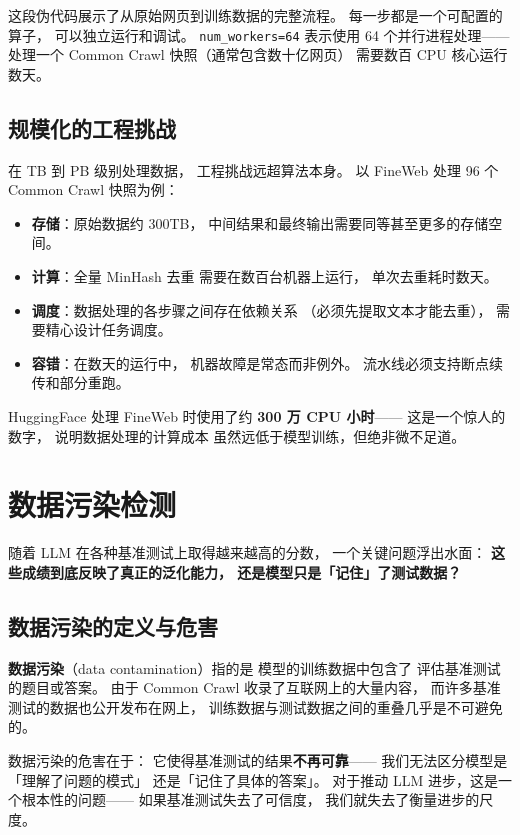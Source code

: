 这段伪代码展示了从原始网页到训练数据的完整流程。
每一步都是一个可配置的算子，
可以独立运行和调试。
\texttt{num\_workers=64} 表示使用 64 个并行进程处理——
处理一个 Common Crawl 快照（通常包含数十亿网页）
需要数百 CPU 核心运行数天。

\subsection{规模化的工程挑战}

在 TB 到 PB 级别处理数据，
工程挑战远超算法本身。
以 FineWeb 处理 96 个 Common Crawl 快照为例：

\begin{itemize}[noitemsep]
  \item \textbf{存储}：原始数据约 300TB，
        中间结果和最终输出需要同等甚至更多的存储空间。
  \item \textbf{计算}：全量 MinHash 去重
        需要在数百台机器上运行，
        单次去重耗时数天。
  \item \textbf{调度}：数据处理的各步骤之间存在依赖关系
        （必须先提取文本才能去重），
        需要精心设计任务调度。
  \item \textbf{容错}：在数天的运行中，
        机器故障是常态而非例外。
        流水线必须支持断点续传和部分重跑。
\end{itemize}

HuggingFace 处理 FineWeb 时使用了约 \textbf{300 万 CPU 小时}——
这是一个惊人的数字，
说明数据处理的计算成本
虽然远低于模型训练，但绝非微不足道。

\section{数据污染检测}

随着 LLM 在各种基准测试上取得越来越高的分数，
一个关键问题浮出水面：
\textbf{这些成绩到底反映了真正的泛化能力，
还是模型只是「记住」了测试数据？}

\subsection{数据污染的定义与危害}

\textbf{数据污染}（data contamination）指的是
模型的训练数据中包含了
评估基准测试的题目或答案。
由于 Common Crawl 收录了互联网上的大量内容，
而许多基准测试的数据也公开发布在网上，
训练数据与测试数据之间的重叠几乎是不可避免的。

数据污染的危害在于：
它使得基准测试的结果\textbf{不再可靠}——
我们无法区分模型是「理解了问题的模式」
还是「记住了具体的答案」。
对于推动 LLM 进步，这是一个根本性的问题——
如果基准测试失去了可信度，
我们就失去了衡量进步的尺度。

